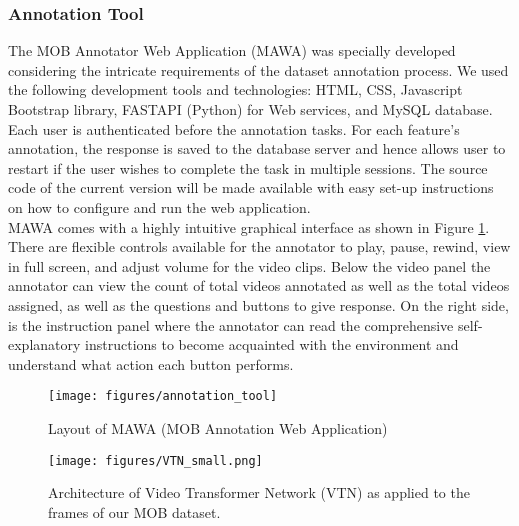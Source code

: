 \documentclass[letterpaper]{article}
\begin{document}
\subsubsection{Annotation Tool}
The MOB Annotator Web Application (MAWA) was specially developed considering the intricate requirements of the dataset annotation process. We used the following development tools and technologies: HTML, CSS, Javascript Bootstrap library, FASTAPI (Python) for Web services, and MySQL database. Each user is authenticated before the annotation tasks. For each feature's annotation, the response is saved to the database server and hence allows user to restart if the user wishes to complete the task in multiple sessions. The source code of the current version will be made available with easy set-up instructions on how to configure and run the web application. 
\\
MAWA comes with a highly intuitive graphical interface as shown in Figure \ref{fig:annotationtool}. There are flexible controls available for the annotator to play, pause, rewind, view in full screen, and adjust volume for the video clips. Below the video panel the annotator can view the count of total videos annotated as well as the total videos assigned, as well as the questions and buttons to give response. On the right side, is the instruction panel where the annotator can read the comprehensive self-explanatory instructions to become acquainted with the environment and understand what action each button performs.


\begin{figure}[htp]
    \centering
    \texttt{[image: figures/annotation\_tool]}
    \caption{Layout of MAWA (MOB Annotation Web Application)}
    \label{fig:annotationtool}
\end{figure}
\begin{figure}[ht!]
    \centering
    \texttt{[image: figures/VTN\_small.png]}
    \caption{Architecture of Video Transformer Network (VTN) as applied to the frames of our MOB dataset.}
    \label{fig:vtn}
\end{figure}

\begingroup
\end{document}
